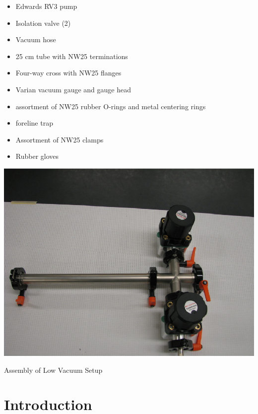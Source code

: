 \begin{minipage}[t]{0.5\textwidth}
\begin{itemize}[noitemsep]
\item Edwards RV3 pump
\item Isolation valve (2)
\item Vacuum hose
\item 25 cm tube with NW25 terminations
\item Four-way cross with NW25 flanges
\end{itemize}
\end{minipage}
\begin{minipage}[t]{0.5\textwidth}
\begin{itemize}[noitemsep]
\item Varian vacuum gauge and gauge head
\item assortment of NW25 rubber O-rings and metal centering rings
\item foreline trap
\item Assortment of NW25 clamps
\item Rubber gloves
\end{itemize}
\end{minipage}

\begin{marginfigure}
\includegraphics{Low-Vacuum-System-Assembled-Table1-2.eps}
\caption{Assembly of Low Vacuum Setup}
\label{fig:VACsetup5}
\end{marginfigure}

\section{Introduction}


